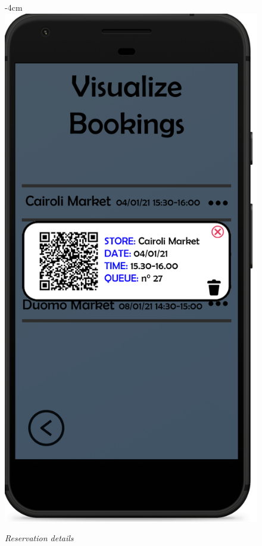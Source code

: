 \documentclass{article}
\begin{document}
		\begin{figure}[H]
			\begin{adjustwidth} {-4cm}{}
				\centering
				\includegraphics[scale=0.45]{../Mockups/VBpopup.png}\\
			\end{adjustwidth}
			\caption{\emph{Reservation details}}
		\end{figure}
		
\end{document}
